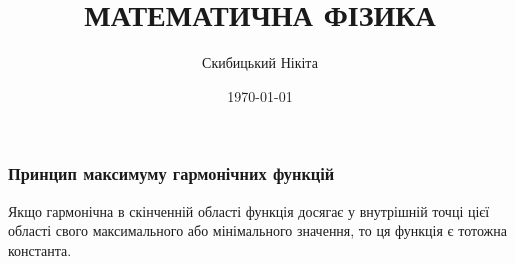 

\title{{\Huge МАТЕМАТИЧНА ФІЗИКА}}
\author{Скибицький Нікіта}
\date{\today}





\tableofcontents

\setcounter{section}{4}
\setcounter{subsection}{5}
\setcounter{subsubsection}{1}
\setcounter{equation}{13}

\subsubsection{Принцип максимуму гармонічних функцій}

\begin{theorem}
	Якщо гармонічна в скінченній області функція досягає у внутрішній точці цієї області свого максимального або мінімального значення, то ця функція є тотожна константа.
\end{theorem}

